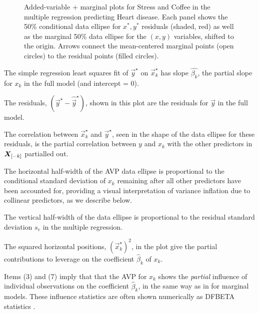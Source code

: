 \begin{figure}[htb]
\begin{minipage}[b]{.49\linewidth}
 \end{minipage}
  \caption{Added-variable $+$ marginal plots for Stress and Coffee in the multiple regression predicting Heart disease.
Each panel shows the 50\% conditional data ellipse for $x^{*}, y^{*}$ residuals (shaded, red) as well as the marginal 50\%
data ellipse for the $(x, y)$ variables, shifted to the origin.
Arrows connect the mean-centered marginal points (open circles) to the residual points (filled circles).}
  \label{fig:coffee-avplot-B}
\end{figure}

\begin{enumerate*}

 \item The simple regression least squares fit of $\vec{y}^\star$ on $\vec{x}_k^\star$ has slope $\hat{\beta_k}$,
 the partial slope for $x_k$ in the full model (and intercept = 0).

 \item The residuals, $(\vec{y}^\star - \widehat{\vec{y}}^\star)$, shown in this plot are the residuals for $\vec{y}$ in the full model.

 \item The correlation between $\vec{x}_k^\star$ and $\vec{y}^\star$, seen in the shape of the data ellipse for these residuals,
 is the partial correlation between $y$ and $x_k$ with the other predictors in $\bm{X}_{[-k]}$ partialled out.

 \item The horizontal half-width of the AVP data ellipse is proportional to the conditional standard deviation of
 $x_k$ remaining after all other predictors have been accounted for, providing a visual interpretation
 of variance inflation due to collinear predictors, as we describe below.

 \item The vertical half-width of the data ellipse is proportional to the residual standard deviation $s_e$ in the multiple regression.

 \item The squared horizontal positions, $(\vec{x}_k^\star)^2$, in the plot give the partial contributions
 to leverage on the coefficient $\hat{\beta}_k$ of $x_k$. 

 \item Items (3) and (7) imply that 
 that the AVP for $x_k$ shows the \emph{partial} influence of individual observations on the coefficient $\hat{\beta}_k$, 
 in the same way as in  for marginal models. These influence statistics are
 often shown numerically
 as DFBETA statistics \citep{Belsley-etal:80}.
 

\end{enumerate*}
